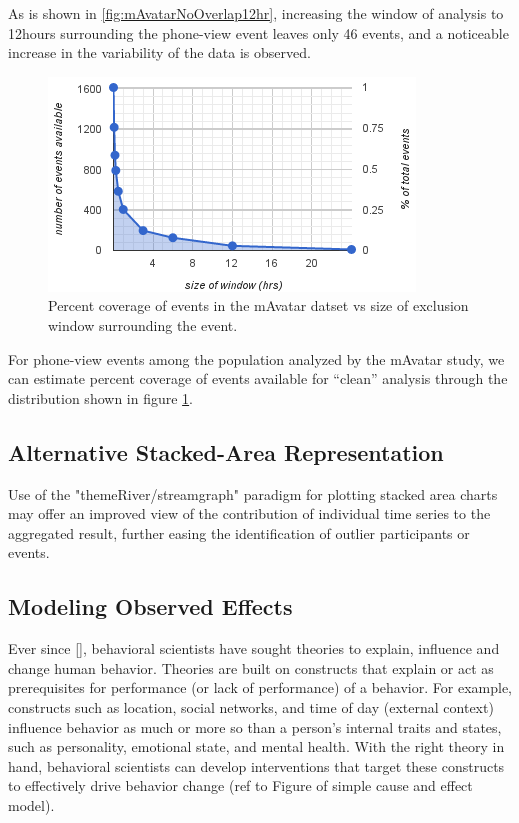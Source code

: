 As is shown in \ref{fig:mAvatarNoOverlap12hr}, increasing the window of analysis to 12hours surrounding the phone-view event leaves only 46 events, and a noticeable increase in the variability of the data is observed.

\begin{figure}
\centering
\includegraphics[width=0.9\columnwidth]{./img/events_v_windowSize.png}
\caption{Percent coverage of events in the mAvatar datset vs size of exclusion window surrounding the event.}
\label{fig:eventsVwindow}
\end{figure}

For phone-view events among the population analyzed by the mAvatar study, we can estimate percent coverage of events available for ``clean'' analysis through the distribution shown in figure \ref{fig:eventsVwindow}.

\subsection{Alternative Stacked-Area Representation}
Use of the "themeRiver/streamgraph" \cite{havre2000, byron2008} paradigm for plotting stacked area charts may offer an improved view of the contribution of individual time series to the aggregated result, further easing the identification of outlier participants or events.

\subsection{Modeling Observed Effects}
Ever since [], behavioral scientists have sought theories to explain, influence and change human behavior.
Theories are  built on constructs that explain or act as prerequisites for performance (or lack of performance) of a behavior.
For example, constructs such as location, social networks, and time of day (external context) influence behavior as much or more so than a person's internal traits and states, such as personality, emotional state, and mental health.
With the right theory in hand, behavioral scientists can develop interventions that target these constructs to effectively drive behavior change (ref to Figure of simple cause and effect model).

